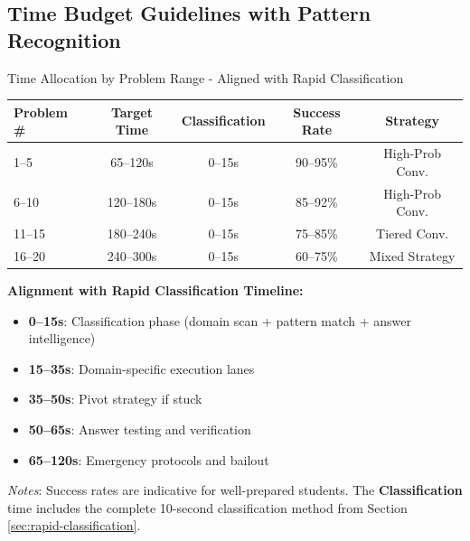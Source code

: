 \documentclass{article}
\begin{document}
\subsection{Time Budget Guidelines with Pattern Recognition}

\begin{timebox}{Time Allocation by Problem Range - Aligned with Rapid Classification}
\begin{center}
\begin{tabular}{|l|c|c|c|c|}
\hline
\textbf{Problem \#} & \textbf{Target Time} & \textbf{Classification} & \textbf{Success Rate} & \textbf{Strategy} \\
\hline
1--5 & 65--120s & 0--15s & 90--95\% & High-Prob Conv. \\
6--10 & 120--180s & 0--15s & 85--92\% & High-Prob Conv. \\
11--15 & 180--240s & 0--15s & 75--85\% & Tiered Conv. \\
16--20 & 240--300s & 0--15s & 60--75\% & Mixed Strategy \\
\hline
\end{tabular}
\end{center}
\smallskip
\textbf{Alignment with Rapid Classification Timeline:}
\begin{itemize}[nosep]
\item \textbf{0--15s}: Classification phase (domain scan + pattern match + answer intelligence)
\item \textbf{15--35s}: Domain-specific execution lanes
\item \textbf{35--50s}: Pivot strategy if stuck
\item \textbf{50--65s}: Answer testing and verification
\item \textbf{65--120s}: Emergency protocols and bailout
\end{itemize}
\textit{Notes}: Success rates are indicative for well-prepared students. The \textbf{Classification} time includes the complete 10-second classification method from Section \ref{sec:rapid-classification}.
\end{timebox}
\end{document}
